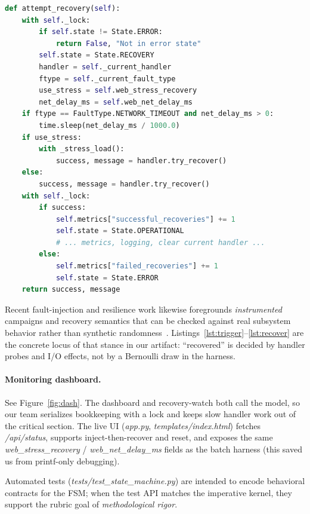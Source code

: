 \documentclass[sigconf,authorversion,nonacm]{acmart}
\begin{document}
\begin{lstlisting}[language=Python, basicstyle=\ttfamily\scriptsize, caption={\emph{attempt\_recovery} (excerpt; lock released before I/O).}, label={lst:recover}]
def attempt_recovery(self):
    with self._lock:
        if self.state != State.ERROR:
            return False, "Not in error state"
        self.state = State.RECOVERY
        handler = self._current_handler
        ftype = self._current_fault_type
        use_stress = self.web_stress_recovery
        net_delay_ms = self.web_net_delay_ms
    if ftype == FaultType.NETWORK_TIMEOUT and net_delay_ms > 0:
        time.sleep(net_delay_ms / 1000.0)
    if use_stress:
        with _stress_load():
            success, message = handler.try_recover()
    else:
        success, message = handler.try_recover()
    with self._lock:
        if success:
            self.metrics["successful_recoveries"] += 1
            self.state = State.OPERATIONAL
            # ... metrics, logging, clear current handler ...
        else:
            self.metrics["failed_recoveries"] += 1
            self.state = State.ERROR
    return success, message
\end{lstlisting}

\noindent Recent fault-injection and resilience work likewise foregrounds \emph{instrumented} campaigns and recovery semantics that can be checked against real subsystem behavior rather than synthetic randomness~\cite{he2024microfi,assad2024icse}. Listings~\ref{lst:trigger}--\ref{lst:recover} are the concrete locus of that stance in our artifact: ``recovered'' is decided by handler probes and I/O effects, not by a Bernoulli draw in the harness.

\paragraph{Monitoring dashboard.}
See Figure~\ref{fig:dash}. The dashboard and recovery-watch both call the model, so our team serializes bookkeeping with a lock and keeps slow handler work out of the critical section. The live UI (\emph{app.py}, \emph{templates/index.html}) fetches \emph{/api/status}, supports inject-then-recover and reset, and exposes the same \emph{web\_stress\_recovery} / \emph{web\_net\_delay\_ms} fields as the batch harness (this saved us from printf-only debugging).

Automated tests (\emph{tests/test\_state\_machine.py}) are intended to encode behavioral contracts for the FSM; when the test API matches the imperative kernel, they support the rubric goal of \emph{methodological rigor}.
\end{document}
